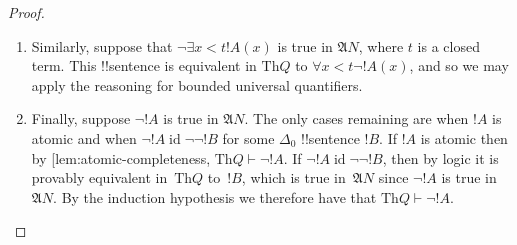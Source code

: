 \documentclass[10pt,a4paper]{article}
\makeatletter
\theoremstyle{plain}
\theoremstyle{definition}
\theoremstyle{remark}
\newcommand{\olref}{\@ifnextchar[{\olref@i}{\olref@final}}
\def\olref@i[#1]{\@ifnextchar[{\olref@ii}{\olref@final}}
\def\olref@ii[#1]{\@ifnextchar[{\olref@iii}{\olref@final}}
\def\olref@iii[#1]{\olref@final}
\def\olref@final#1{\ref{#1}}
\providecommand{\Proves}{\mathrel{\vdash}}
\providecommand{\Struct}{\ensuremath{\mathfrak{A}}}
\providecommand{\Th}{\ensuremath{\mathrm{Th}}}
\providecommand{\bforall}{\forall}
\providecommand{\bexists}{\exists}
\providecommand{\ident}{\operatorname{id}}
\makeatother
\begin{document}
\begin{proof}
\begin{enumerate}
%
\item Similarly, suppose that $\lnot \bexists{x<t}!A(x)$ is
true in $\Struct{N}$, where $t$ is a closed term. This
!!{sentence} is equivalent in $\Th{Q}$ to
$\bforall{x<t}{\lnot!A(x)}$, and so we may apply the reasoning
for bounded universal quantifiers.
%
\item Finally, suppose $\lnot !A$ is true in $\Struct{N}$.
The only cases remaining are when $!A$ is atomic and when
$\lnot !A \ident \lnot\lnot !B$ for some $\Delta_0$
!!{sentence} $!B$. If $!A$ is atomic then by
\olref{lem:atomic-completeness}, $\Th{Q} \Proves \lnot !A$.
If $\lnot !A \ident \lnot\lnot !B$, then by logic it is
provably equivalent in~$\Th{Q}$ to~$!B$, which is true 
in~$\Struct{N}$ since $\lnot !A$ is true in~$\Struct{N}$.
By the induction hypothesis we therefore have that
$\Th{Q} \Proves \lnot !A$.
\end{enumerate}
\end{proof}
\end{document}

